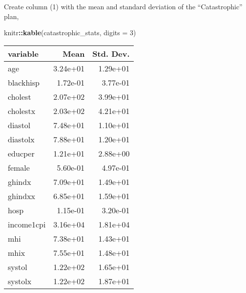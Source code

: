 \documentclass[]{book}
\newenvironment{Shaded}{\begin{snugshade}}{\end{snugshade}}
\newcommand{\DataTypeTok}[1]{\textcolor[rgb]{0.13,0.29,0.53}{#1}}
\newcommand{\DecValTok}[1]{\textcolor[rgb]{0.00,0.00,0.81}{#1}}
\newcommand{\KeywordTok}[1]{\textcolor[rgb]{0.13,0.29,0.53}{\textbf{#1}}}
\newcommand{\NormalTok}[1]{#1}
\newcommand{\OperatorTok}[1]{\textcolor[rgb]{0.81,0.36,0.00}{\textbf{#1}}}
\newcommand{\OtherTok}[1]{\textcolor[rgb]{0.56,0.35,0.01}{#1}}
\newcommand{\StringTok}[1]{\textcolor[rgb]{0.31,0.60,0.02}{#1}}
\theoremstyle{definition}
\theoremstyle{definition}
\theoremstyle{definition}
\theoremstyle{remark}
\begin{document}
Create column (1) with the mean and standard deviation of the
``Catastrophic'' plan,

\begin{Shaded}
\end{Shaded}

\begin{Shaded}
\begin{Highlighting}[]
\NormalTok{knitr}\OperatorTok{::}\KeywordTok{kable}\NormalTok{(catastrophic_stats, }\DataTypeTok{digits =} \DecValTok{3}\NormalTok{)}
\end{Highlighting}
\end{Shaded}

\begin{tabular}{l|r|r}
\hline
variable & Mean & Std. Dev.\\
\hline
age & 3.24e+01 & 1.29e+01\\
\hline
blackhisp & 1.72e-01 & 3.77e-01\\
\hline
cholest & 2.07e+02 & 3.99e+01\\
\hline
cholestx & 2.03e+02 & 4.21e+01\\
\hline
diastol & 7.48e+01 & 1.10e+01\\
\hline
diastolx & 7.88e+01 & 1.20e+01\\
\hline
educper & 1.21e+01 & 2.88e+00\\
\hline
female & 5.60e-01 & 4.97e-01\\
\hline
ghindx & 7.09e+01 & 1.49e+01\\
\hline
ghindxx & 6.85e+01 & 1.59e+01\\
\hline
hosp & 1.15e-01 & 3.20e-01\\
\hline
income1cpi & 3.16e+04 & 1.81e+04\\
\hline
mhi & 7.38e+01 & 1.43e+01\\
\hline
mhix & 7.55e+01 & 1.48e+01\\
\hline
systol & 1.22e+02 & 1.65e+01\\
\hline
systolx & 1.22e+02 & 1.87e+01\\
\hline
\end{tabular}
\end{document}
